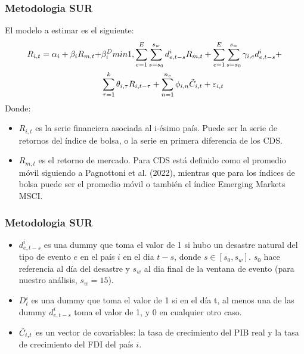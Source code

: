 \documentclass{beamer}
\begin{document}
\begin{frame}
\frametitle{Metodologia SUR}
El modelo a estimar es el siguiente:
\begin{align}
    R_{i,t} = \alpha_i + \beta_iR_{m,t} + &\beta_i^D min {1, \sum_{e=1}^{E} \sum_{s=s_0}^{s_w} d_{e,t-s}^{i}} R_{m,t} + \sum_{e=1}^{E} \sum_{s=s_0}^{s_w} \gamma_{i,e}d_{e,t-s}^{i}+ \\ &\sum_{\tau=1}^{k}\theta_{i,\tau} R_{i,t-\tau}+\sum_{n=1}^{n_c}\phi_{i,n}\Tilde{C}_{i,t}+\varepsilon_{i,t} \nonumber
\end{align}
Donde:
\begin{itemize}
    \item $R_{i,t}$ es la serie financiera asociada al i-ésimo país. Puede ser la serie de retornos del índice de bolsa, o la serie en primera diferencia de los CDS.
    \item $R_{m,t}$ es el retorno de mercado. Para CDS está definido como el promedio móvil siguiendo a Pagnottoni et al. (2022), mientras que para los índices de bolsa puede ser el promedio móvil o también el índice Emerging Markets MSCI.
\end{itemize}
\end{frame}

\begin{frame}
\frametitle{Metodologia SUR}
\begin{itemize}
    \item $d_{e,t-s}^i$ es una dummy que toma el valor de 1 si hubo un desastre natural del tipo de evento $e$ en el país $i$ en el dia $t-s$, donde $s \in [s_0,s_w]$. $s_0$ hace referencia al día del desastre y $s_w$ al dia final de la ventana de evento (para nuestro análisis, $s_w=15$).
    \item $D_t^{i}$ es una dummy que toma el valor de 1 si en el día t, al menos una de las dummy $d_{e,t-s}^i$ toma el valor de 1, y 0 en cualquier otro caso.
    \item $\Tilde{C}_{i,t}$ es un vector de covariables: la tasa de crecimiento del PIB real y la tasa de crecimiento del FDI del país $i$.
\end{itemize}
\end{frame}
\end{document}
